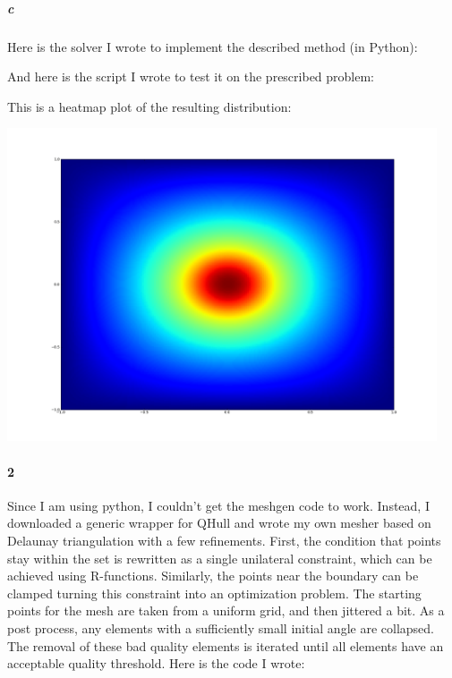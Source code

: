 \documentclass{article}
\begin{document}
\subparagraph{c}

Here is the solver I wrote to implement the described method (in Python):

\pagebreak


And here is the script I wrote to test it on the prescribed problem:



This is a heatmap plot of the resulting distribution:

\begin{center}
\includegraphics[width=5in]{prob1_result.png}
\end{center}

\paragraph{2}

Since I am using python, I couldn't get the meshgen code to work.  Instead, I downloaded a generic wrapper for QHull and wrote my own mesher based on Delaunay triangulation with a few refinements.  First, the condition that points stay within the set is rewritten as a single unilateral constraint, which can be achieved using R-functions.  Similarly, the points near the boundary can be clamped turning this constraint into an optimization problem.  The starting points for the mesh are taken from a uniform grid, and then jittered a bit.  As a post process, any elements with a sufficiently small initial angle are collapsed.  The removal of these bad quality elements is iterated until all elements have an acceptable quality threshold.  Here is the code I wrote:
\end{document}
